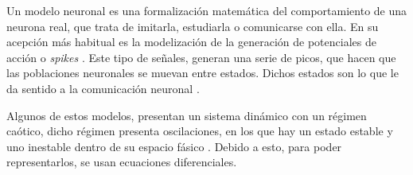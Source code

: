 
Un modelo neuronal es una formalización matemática del comportamiento de una neurona real, que trata de imitarla, estudiarla o comunicarse con ella. En su acepción más habitual es la modelización de la generación de potenciales de acción o \textit{spikes} \cite{Fortuna2023}. Este tipo de señales, generan una serie de picos, que hacen que las poblaciones neuronales se muevan entre estados. Dichos estados son lo que le da sentido a la comunicación neuronal \cite{Rabinovich2008}.

Algunos de estos modelos, presentan un sistema dinámico con un régimen caótico, dicho régimen presenta oscilaciones, en los que hay un estado estable y uno inestable dentro de su espacio fásico \cite{Rulkov2002}. Debido a esto, para poder representarlos, se usan ecuaciones diferenciales.  
